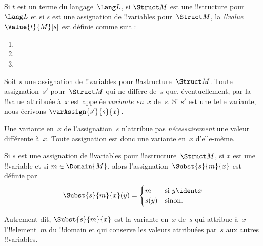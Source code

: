 \documentclass[../../../include/open-logic-section]{subfiles}
\begin{document}
\begin{defn}
Si $t$ est un terme du langage~$\Lang L$, si $\Struct M$ est une
!!{structure} pour~$\Lang L$ et si $s$ est une assignation de
!!{variable}s pour~$\Struct M$, la \emph{!!{value}}~$\Value{t}{M}[s]$
est définie comme suit :
\begin{enumerate}
\item {}
\item {}
\item {}
\end{enumerate}
\end{defn}

\begin{defn}[Variante en~$x$]
Soit $s$ une assignation de !!{variable}s pour !!a{structure}~$\Struct M$.
Toute assignation~$s'$ pour~$\Struct M$ qui ne diffère de~$s$ que,
éventuellement, par la !!{value} attribuée à~$x$ est appelée
\emph{variante en~$x$} de~$s$. Si $s'$ est une telle variante,
nous écrivons $\varAssign{s'}{s}{x}$.
\end{defn}

\begin{explain}
Une variante en~$x$ de l'assignation~$s$ n'attribue pas
\emph{nécessairement} une valeur différente à~$x$. Toute assignation
est donc une variante en~$x$ d'elle-même.
\end{explain}

\begin{defn}
  Si $s$ est une assignation de !!{variable}s pour
  !!a{structure}~$\Struct M$, si $x$ est une !!{variable} et si
  $m \in \Domain{M}$, alors l'assignation~$\Subst{s}{m}{x}$ est définie par
  \[\Subst{s}{m}{x}(y) = \begin{cases}
    m & \text{si } y \ident x\\
    s(y) & \text{sinon}.
  \end{cases}\]
\end{defn}

Autrement dit, $\Subst{s}{m}{x}$ est la variante en~$x$ de~$s$ qui
attribue à~$x$ l'!!{element}~$m$ du !!{domain} et qui conserve les
valeurs attribuées par~$s$ aux autres !!{variable}s.
\end{document}
